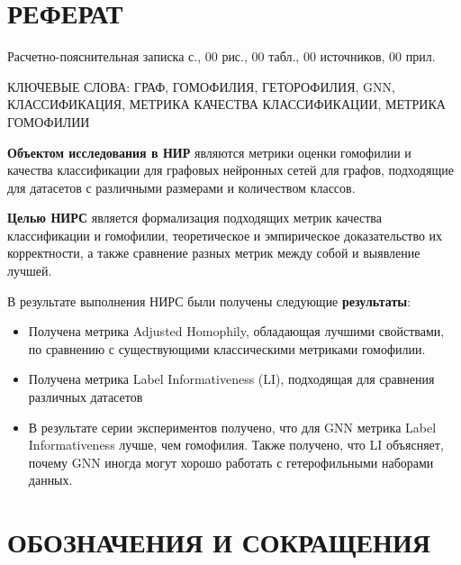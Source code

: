 \documentclass[a4paper,14pt]{article}
\begin{document}
    
    
    \section*{\hfill РЕФЕРАТ \hfill}
    
    Расчетно-пояснительная записка \pageref{LastPage} с., 00 рис., 00 табл., 00 источников, 00 прил.
    
    КЛЮЧЕВЫЕ СЛОВА: ГРАФ, ГОМОФИЛИЯ, ГЕТОРОФИЛИЯ, GNN, КЛАССИФИКАЦИЯ, МЕТРИКА КАЧЕСТВА КЛАССИФИКАЦИИ, МЕТРИКА ГОМОФИЛИИ 
    
    \textbf{Объектом исследования в  НИР} являются метрики оценки гомофилии и качества классификации для графовых нейронных сетей для графов, подходящие для датасетов с различными размерами и количеством классов.
    
    \textbf{Целью НИРС} является формализация подходящих метрик качества классификации и гомофилии, теоретическое и эмпирическое доказательство их корректности, а также сравнение разных метрик между собой и выявление лучшей. 
    
    
    В результате выполнения НИРС были получены следующие \textbf{результаты}:
    
    \begin{itemize}
    	\item Получена метрика Adjusted Homophily, обладающая лучшими свойствами, по сравнению с существующими классическими метриками гомофилии. 
    
    	\item Получена метрика Label Informativeness (LI), подходящая для сравнения различных датасетов 
    
    	\item В результате серии экспериментов получено, что  для  GNN метрика Label Informativeness лучше, чем гомофилия.
    	Также получено, что LI объясняет, почему GNN иногда могут хорошо работать с гетерофильными наборами данных.
\end{itemize}

  
    \newpage
    
    \tableofcontents
    \pagebreak
    
    \newpage
    
	\section*{ \hfill ОБОЗНАЧЕНИЯ И СОКРАЩЕНИЯ \hfill}
	
\end{document}
